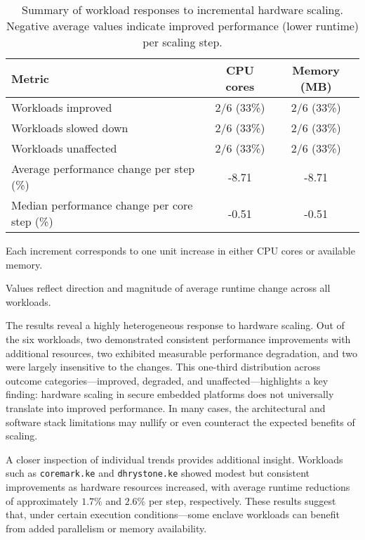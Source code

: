 \begin{table}[htbp]
\centering
\begin{threeparttable}
\caption{Summary of workload responses to incremental hardware scaling. Negative average values indicate improved performance (lower runtime) per scaling step.}
\label{tab:hardware-impact}
\begin{tabular}{@{}lcc@{}}
\toprule
\textbf{Metric} & \textbf{CPU cores} & \textbf{Memory (MB)} \\
\midrule
Workloads improved                      & 2/6 (33\%) & 2/6 (33\%) \\
Workloads slowed down                   & 2/6 (33\%) & 2/6 (33\%) \\
Workloads unaffected                    & 2/6 (33\%) & 2/6 (33\%) \\
Average performance change per step (\%)& -8.71      & -8.71      \\
Median performance change per core step (\%) & -0.51      & -0.51      \\
\bottomrule
\end{tabular}
\begin{tablenotes}
\footnotesize
\item Each increment corresponds to one unit increase in either CPU cores or available memory.
\item Values reflect direction and magnitude of average runtime change across all workloads.
\end{tablenotes}
\end{threeparttable}
\end{table}

The results reveal a highly heterogeneous response to hardware scaling. Out of the six workloads, two demonstrated consistent performance improvements with additional resources, two exhibited measurable performance degradation, and two were largely insensitive to the changes. This one-third distribution across outcome categories—improved, degraded, and unaffected—highlights a key finding: hardware scaling in secure embedded platforms does not universally translate into improved performance. In many cases, the architectural and software stack limitations may nullify or even counteract the expected benefits of scaling.

A closer inspection of individual trends provides additional insight. Workloads such as \texttt{coremark.ke} and \texttt{dhrystone.ke} showed modest but consistent improvements as hardware resources increased, with average runtime reductions of approximately $1.7\%$ and $2.6\%$ per step, respectively. These results suggest that, under certain execution conditions—some enclave workloads can benefit from added parallelism or memory availability.

